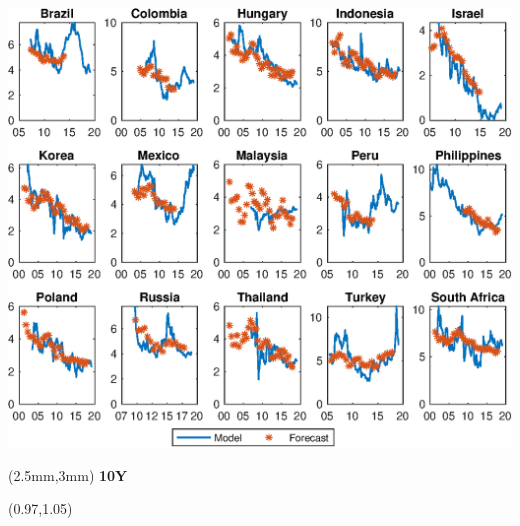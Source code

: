 \documentclass[12pt, aspectratio=169, xcolor=dvipsnames]{beamer}
\begin{document}
\begin{frame}[label=yPscbp]
\vspace{0.1cm}
\begin{center}							%
	\includegraphics[trim={0cm 0cm 0cm 0cm},clip,height=0.95\textheight,width=\linewidth]{../Figures/Estimation/bsl_yP_scbp.eps} \\
\end{center}
\begin{textblock*}{15cm}(2.5mm,3mm)
	\textbf{10Y}
\end{textblock*}
\begin{textblock*}{5cm}(0.97\textwidth,1.05\textheight)
	\hyperlink{YldDcmp10}{}
\end{textblock*}
\end{frame}
\end{document}
